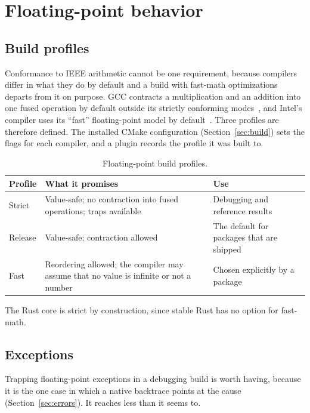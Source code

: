 \documentclass[11pt,a4paper]{article}
\begin{document}
\section{Floating-point behavior}
\label{sec:floating-point}

\subsection{Build profiles}

Conformance to IEEE arithmetic cannot be one requirement, because compilers
differ in what they do by default and a build with fast-math optimizations
departs from it on purpose.  GCC contracts a multiplication and an addition
into one fused operation by default outside its strictly conforming
modes~\cite{gccopt}, and Intel's compiler uses its \enquote{fast}
floating-point model by default~\cite{intelfp}.  Three profiles are
therefore defined.  The installed CMake configuration
(Section~\ref{sec:build}) sets the flags for each compiler, and a plugin
records the profile it was built to.

\begin{table}[ht]
\centering
\small
\begin{tabularx}{\textwidth}{@{}l L L@{}}
\toprule
Profile & What it promises & Use \\
\midrule
Strict & Value-safe; no contraction into fused operations; traps available & Debugging and reference results \\
Release & Value-safe; contraction allowed & The default for packages that are shipped \\
Fast & Reordering allowed; the compiler may assume that no value is infinite or not a number & Chosen explicitly by a package \\
\bottomrule
\end{tabularx}
\caption{Floating-point build profiles.}
\label{tab:fp-profiles}
\end{table}

The Rust core is strict by construction, since stable Rust has no option
for fast-math.

\subsection{Exceptions}

Trapping floating-point exceptions in a debugging build is worth having,
because it is the one case in which a native backtrace points at the cause
(Section~\ref{sec:errors}).  It reaches less than it seems to.
\end{document}
